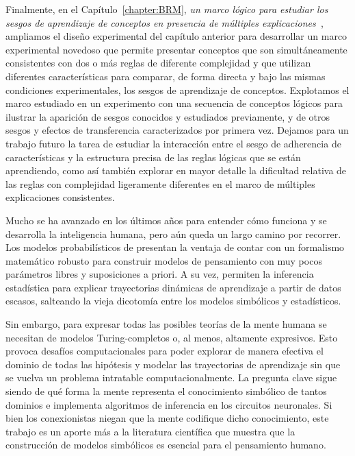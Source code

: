 Finalmente, en el Capítulo~\ref{chapter:BRM}, \textit{un marco lógico para estudiar los sesgos de aprendizaje de conceptos en presencia de múltiples explicaciones~\cite{tano2021framework}}, ampliamos el diseño experimental del capítulo anterior para desarrollar un marco experimental novedoso que permite presentar conceptos que son simultáneamente consistentes con dos o más reglas de diferente complejidad y que utilizan diferentes características para comparar, de forma directa y bajo las mismas condiciones experimentales, los sesgos de aprendizaje de conceptos. Explotamos el marco estudiado en un experimento con una secuencia de conceptos lógicos para ilustrar la aparición de sesgos conocidos y estudiados previamente, y de otros sesgos y efectos de transferencia caracterizados por primera vez. Dejamos para un trabajo futuro la tarea de estudiar la interacción entre el sesgo de adherencia de características y la estructura precisa de las reglas lógicas que se están aprendiendo, como así también explorar en mayor detalle la dificultad relativa de las reglas con complejidad \mdlbool ligeramente diferentes en el marco de múltiples explicaciones consistentes.

\bigskip

Mucho se ha avanzado en los últimos años para entender cómo funciona y se desarrolla la inteligencia humana, pero aún queda un largo camino por recorrer. Los modelos probabilísticos de \lot presentan la ventaja de contar con un formalismo matemático robusto para construir modelos de pensamiento con muy pocos parámetros libres y suposiciones a priori. A su vez, permiten la inferencia estadística para explicar trayectorias dinámicas de aprendizaje a partir de datos escasos, salteando la vieja dicotomía entre los modelos simbólicos y estadísticos.

Sin embargo, para expresar todas las posibles teorías de la mente humana se necesitan de modelos \lot Turing-completos o, al menos, altamente expresivos. Esto provoca desafíos computacionales para poder explorar de manera efectiva el dominio de todas las hipótesis y modelar las trayectorias de aprendizaje sin que se vuelva un problema intratable computacionalmente. La pregunta clave sigue siendo de qué forma la mente representa el conocimiento simbólico de tantos dominios e implementa algoritmos de inferencia en los circuitos neuronales. Si bien los conexionistas niegan que la mente codifique dicho conocimiento, este trabajo es un aporte más a la literatura científica que muestra que la construcción de modelos simbólicos es esencial para el pensamiento humano.